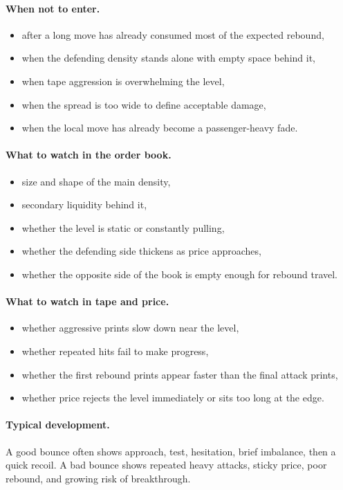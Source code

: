 \paragraph{When not to enter.}
\begin{itemize}
\item after a long move has already consumed most of the expected rebound,
\item when the defending density stands alone with empty space behind it,
\item when tape aggression is overwhelming the level,
\item when the spread is too wide to define acceptable damage,
\item when the local move has already become a passenger-heavy fade.
\end{itemize}

\paragraph{What to watch in the order book.}
\begin{itemize}
\item size and shape of the main density,
\item secondary liquidity behind it,
\item whether the level is static or constantly pulling,
\item whether the defending side thickens as price approaches,
\item whether the opposite side of the book is empty enough for rebound travel.
\end{itemize}

\paragraph{What to watch in tape and price.}
\begin{itemize}
\item whether aggressive prints slow down near the level,
\item whether repeated hits fail to make progress,
\item whether the first rebound prints appear faster than the final attack prints,
\item whether price rejects the level immediately or sits too long at the edge.
\end{itemize}

\paragraph{Typical development.} A good bounce often shows approach, test, hesitation, brief imbalance, then a quick recoil. A bad bounce shows repeated heavy attacks, sticky price, poor rebound, and growing risk of breakthrough.

